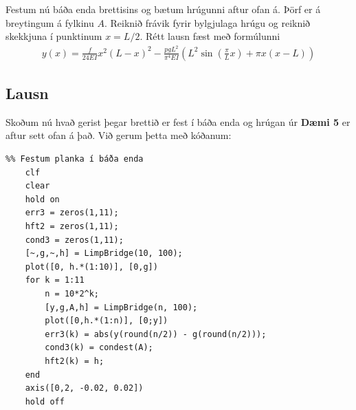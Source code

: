 \documentclass[11pt]{article}
\begin{document}
{Festum nú báða enda brettisins og bætum hrúgunni aftur ofan á. Þörf er á breytingum á fylkinu $A$. Reiknið frávik fyrir bylgjulaga hrúgu og reiknið skekkjuna í punktinum $x = L/2$. Rétt lausn fæst með formúlunni
\begin{align*}
	y(x) = \frac{f}{24EI}x^2(L-x)^2 - \frac{pgL^2}{\pi^4EI}\left(L^2\sin\left(\frac{\pi}{L}x\right) + \pi x(x - L)\right)
\end{align*}

\subsection*{Lausn}
Skoðum nú hvað gerist þegar brettið er fest í báða enda og hrúgan úr \textbf{Dæmi 5} er aftur sett ofan á það. Við gerum þetta með kóðanum: 
\begin{verbatim}
%% Festum planka í báða enda
    clf
    clear
    hold on
    err3 = zeros(1,11);
    hft2 = zeros(1,11);
    cond3 = zeros(1,11);
    [~,g,~,h] = LimpBridge(10, 100);
    plot([0, h.*(1:10)], [0,g])
    for k = 1:11
        n = 10*2^k;
        [y,g,A,h] = LimpBridge(n, 100);
        plot([0,h.*(1:n)], [0;y])
        err3(k) = abs(y(round(n/2)) - g(round(n/2)));
        cond3(k) = condest(A);
        hft2(k) = h;
    end
    axis([0,2, -0.02, 0.02])
    hold off
\end{verbatim}

}
\end{document}
